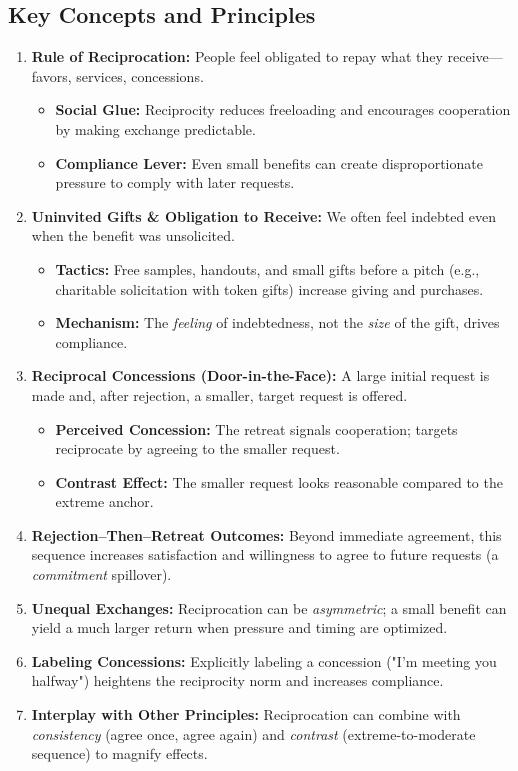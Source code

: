 \subsection*{Key Concepts and Principles}
\begin{enumerate}
    \item \textbf{Rule of Reciprocation:} People feel obligated to repay what they receive—favors, services, concessions.
    \begin{itemize}
        \item \textbf{Social Glue:} Reciprocity reduces freeloading and encourages cooperation by making exchange predictable.
        \item \textbf{Compliance Lever:} Even small benefits can create disproportionate pressure to comply with later requests.
    \end{itemize}

    \item \textbf{Uninvited Gifts \& Obligation to Receive:} We often feel indebted even when the benefit was unsolicited.
    \begin{itemize}
        \item \textbf{Tactics:} Free samples, handouts, and small gifts before a pitch (e.g., charitable solicitation with token gifts) increase giving and purchases.
        \item \textbf{Mechanism:} The \emph{feeling} of indebtedness, not the \emph{size} of the gift, drives compliance.
    \end{itemize}

    \item \textbf{Reciprocal Concessions (Door-in-the-Face):} A large initial request is made and, after rejection, a smaller, target request is offered.
    \begin{itemize}
        \item \textbf{Perceived Concession:} The retreat signals cooperation; targets reciprocate by agreeing to the smaller request.
        \item \textbf{Contrast Effect:} The smaller request looks reasonable compared to the extreme anchor.
    \end{itemize}

    \item \textbf{Rejection–Then–Retreat Outcomes:} Beyond immediate agreement, this sequence increases satisfaction and willingness to agree to future requests (a \emph{commitment} spillover).

    \item \textbf{Unequal Exchanges:} Reciprocation can be \emph{asymmetric}; a small benefit can yield a much larger return when pressure and timing are optimized.

    \item \textbf{Labeling Concessions:} Explicitly labeling a concession ("I’m meeting you halfway") heightens the reciprocity norm and increases compliance.

    \item \textbf{Interplay with Other Principles:} Reciprocation can combine with \emph{consistency} (agree once, agree again) and \emph{contrast} (extreme-to-moderate sequence) to magnify effects.
\end{enumerate}

